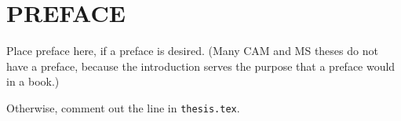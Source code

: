 \chapter*{PREFACE}

Place preface here, if a preface is desired.
(Many CAM and MS theses do not have a preface, because the introduction serves the purpose that a preface would in a book.)

Otherwise, comment out the line \verb++ in \verb+thesis.tex+.




